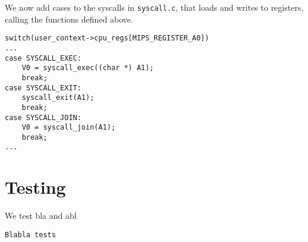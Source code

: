 \documentclass[a4paper,12pt]{article}
\begin{document}
We now add cases to the syscalls in \texttt{syscall.c}, that loads and writes to registers, calling the functions defined above.
\begin{lstlisting}
switch(user_context->cpu_regs[MIPS_REGISTER_A0])
...
case SYSCALL_EXEC:
    V0 = syscall_exec((char *) A1);
    break;
case SYSCALL_EXIT:
    syscall_exit(A1);
    break;
case SYSCALL_JOIN:
    V0 = syscall_join(A1);
    break;
...
\end{lstlisting}

\section{Testing}
We test bla and abl
\begin{lstlisting}
Blabla tests
\end{lstlisting}
\end{document}
